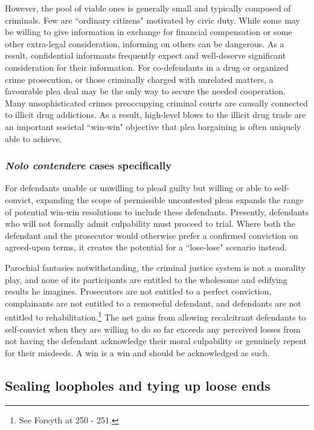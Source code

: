 However, the pool of viable ones is generally small and typically composed of criminals. Few are ``ordinary citizens" motivated by civic duty. While some may be willing to give information in exchange for financial compensation or some other extra-legal consideration, informing on others can be dangerous. As a result, confidential informants frequently expect and well-deserve significant consideration for their information. For co-defendants in a drug or organized crime prosecution, or those criminally charged with unrelated matters, a favourable plea deal may be the only way to secure the needed cooperation. Many unsophisticated crimes preoccupying criminal courts are causally connected to illicit drug addictions. As a result, high-level blows to the illicit drug trade are an important societal ``win-win" objective that plea bargaining is often uniquely able to achieve. 

\subsubsection{\textit{Nolo contendere} cases specifically}

For defendants unable or unwilling to plead guilty but willing or able to self-convict, expanding the scope of permissible uncontested pleas expands the range of potential win-win resolutions to include these defendants. Presently, defendants who will not formally admit culpability must proceed to trial. Where both the defendant and the prosecutor would otherwise prefer a confirmed conviction on agreed-upon terms, it creates the potential for a ``lose-lose" scenario instead.

Parochial fantasies notwithstanding, the criminal justice system is not a morality play, and none of its participants are entitled to the wholesome and edifying results he imagines. Prosecutors are not entitled to a perfect conviction, complainants are not entitled to a remorseful defendant, and defendants are not entitled to rehabilitation.\footnote{See Forsyth at 250 - 251.} The net gains from allowing recalcitrant defendants to self-convict when they are willing to do so far exceeds any perceived losses from not having the defendant acknowledge their moral culpability or genuinely repent for their misdeeds. A win is a win and should be acknowledged as such.

\subsection{Sealing loopholes and tying up loose ends}

